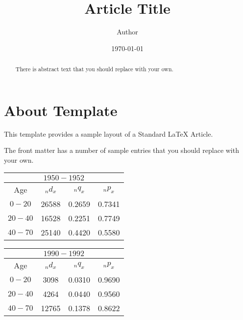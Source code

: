 \documentclass{article}
\begin{document}
\title{Article Title}
\author{Author}
\date{\today}
\maketitle

\begin{abstract}
    There is abstract text that you should replace with your own. 
\end{abstract}

\tableofcontents

\section{About Template}
This template provides a sample layout of a Standard \LaTeX{} Article.

The front matter has a number of sample entries that you should replace
with your own. 


\begin{table}[ht]
\begin{center}
\begin{tabular}{cccc}
\multicolumn{4}{c}{\(1950-1952\)}\\
  \hline
Age & \(_nd_x\) & \(_nq_x\) & \(_np_x\) \\ 
  \hline
\(0-20\) & 26588& 0.2659 & 0.7341 \\ 
\(20-40\) & 16528 & 0.2251 & 0.7749 \\ 
\(40-70\) & 25140 & 0.4420 & 0.5580 \\ 
   \hline
\end{tabular}
\end{center}
\end{table}

\begin{table}[ht]
\begin{center}
\begin{tabular}{cccc}
\multicolumn{4}{c}{\(1990-1992\)}\\
  \hline
Age & \(_nd_x\) & \(_nq_x\) & \(_np_x\) \\ 
  \hline
\(0-20\) & 3098 & 0.0310 & 0.9690 \\ 
\(20-40\) & 4264 & 0.0440 & 0.9560 \\ 
\(40-70\) & 12765 & 0.1378 & 0.8622 \\ 
   \hline
\end{tabular}
\end{center}
\end{table}
\end{document}
